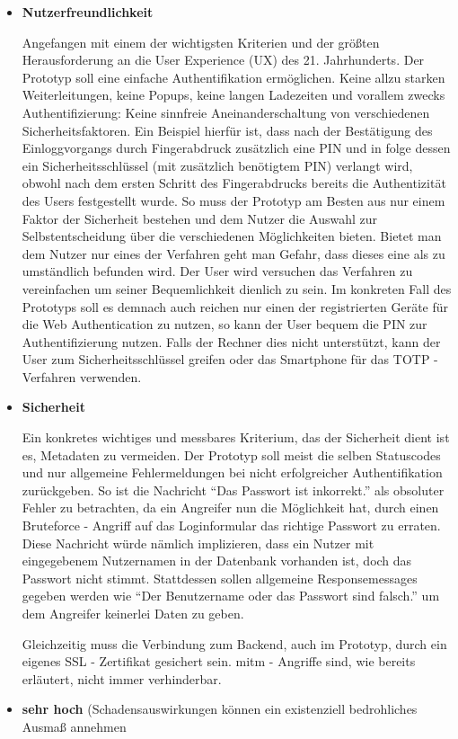 \begin{itemize} 
\item \textbf{Nutzerfreundlichkeit}

Angefangen mit einem der wichtigsten Kriterien und der größten Herausforderung an die User Experience (UX) des 21. Jahrhunderts. Der Prototyp soll eine einfache Authentifikation ermöglichen. Keine allzu starken Weiterleitungen, keine Popups, keine langen Ladezeiten und vorallem zwecks Authentifizierung: Keine sinnfreie Aneinanderschaltung von verschiedenen Sicherheitsfaktoren. Ein Beispiel hierfür ist, dass nach der Bestätigung des Einloggvorgangs durch Fingerabdruck zusätzlich eine PIN und in folge dessen ein Sicherheitsschlüssel (mit zusätzlich benötigtem PIN) verlangt wird, obwohl nach dem ersten Schritt des Fingerabdrucks bereits die Authentizität des Users festgestellt wurde. So muss der Prototyp am Besten aus nur einem Faktor der Sicherheit bestehen und dem Nutzer die Auswahl zur Selbstentscheidung über die verschiedenen Möglichkeiten bieten. Bietet man dem Nutzer nur eines der Verfahren geht man Gefahr, dass dieses eine als zu umständlich befunden wird. Der User wird versuchen das Verfahren zu vereinfachen um seiner Bequemlichkeit dienlich zu sein. Im konkreten Fall des Prototyps soll es demnach auch reichen nur einen der registrierten Geräte für die Web Authentication zu nutzen, so kann der User bequem die PIN zur Authentifizierung nutzen. Falls der Rechner dies nicht unterstützt, kann der User zum Sicherheitsschlüssel greifen oder das Smartphone für das TOTP - Verfahren verwenden.

\item \textbf{Sicherheit}

Ein konkretes wichtiges und messbares Kriterium, das der Sicherheit dient ist es, Metadaten zu vermeiden. Der Prototyp soll meist die selben Statuscodes und nur allgemeine Fehlermeldungen bei nicht erfolgreicher Authentifikation zurückgeben. So ist die Nachricht ``Das Passwort ist inkorrekt.'' als obsoluter Fehler zu betrachten, da ein Angreifer nun die Möglichkeit hat, durch einen Bruteforce - Angriff auf das Loginformular das richtige Passwort zu erraten. Diese Nachricht würde nämlich implizieren, dass ein Nutzer mit eingegebenem Nutzernamen in der Datenbank vorhanden ist, doch das Passwort nicht stimmt. Stattdessen sollen allgemeine Responsemessages gegeben werden wie ``Der Benutzername oder das Passwort sind falsch.'' um dem Angreifer keinerlei Daten zu geben.

Gleichzeitig muss die Verbindung zum Backend, auch im Prototyp, durch ein eigenes SSL - Zertifikat gesichert sein. \ac{mitm} - Angriffe sind, wie bereits erläutert, nicht immer verhinderbar. 

\item \textbf{sehr hoch} (Schadensauswirkungen können ein existenziell bedrohliches Ausmaß annehmen
\end{itemize}
